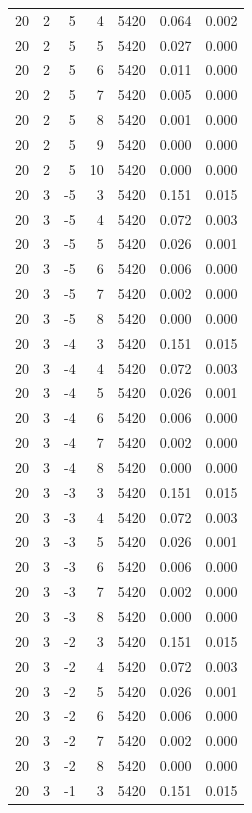 \begin{table}
\begin{tabular}{rrrrrrr}
20 & 2 & 5 & 4 & 5420 & 0.064 & 0.002 \\
20 & 2 & 5 & 5 & 5420 & 0.027 & 0.000 \\
20 & 2 & 5 & 6 & 5420 & 0.011 & 0.000 \\
20 & 2 & 5 & 7 & 5420 & 0.005 & 0.000 \\
20 & 2 & 5 & 8 & 5420 & 0.001 & 0.000 \\
20 & 2 & 5 & 9 & 5420 & 0.000 & 0.000 \\
20 & 2 & 5 & 10 & 5420 & 0.000 & 0.000 \\
20 & 3 & -5 & 3 & 5420 & 0.151 & 0.015 \\
20 & 3 & -5 & 4 & 5420 & 0.072 & 0.003 \\
20 & 3 & -5 & 5 & 5420 & 0.026 & 0.001 \\
20 & 3 & -5 & 6 & 5420 & 0.006 & 0.000 \\
20 & 3 & -5 & 7 & 5420 & 0.002 & 0.000 \\
20 & 3 & -5 & 8 & 5420 & 0.000 & 0.000 \\
20 & 3 & -4 & 3 & 5420 & 0.151 & 0.015 \\
20 & 3 & -4 & 4 & 5420 & 0.072 & 0.003 \\
20 & 3 & -4 & 5 & 5420 & 0.026 & 0.001 \\
20 & 3 & -4 & 6 & 5420 & 0.006 & 0.000 \\
20 & 3 & -4 & 7 & 5420 & 0.002 & 0.000 \\
20 & 3 & -4 & 8 & 5420 & 0.000 & 0.000 \\
20 & 3 & -3 & 3 & 5420 & 0.151 & 0.015 \\
20 & 3 & -3 & 4 & 5420 & 0.072 & 0.003 \\
20 & 3 & -3 & 5 & 5420 & 0.026 & 0.001 \\
20 & 3 & -3 & 6 & 5420 & 0.006 & 0.000 \\
20 & 3 & -3 & 7 & 5420 & 0.002 & 0.000 \\
20 & 3 & -3 & 8 & 5420 & 0.000 & 0.000 \\
20 & 3 & -2 & 3 & 5420 & 0.151 & 0.015 \\
20 & 3 & -2 & 4 & 5420 & 0.072 & 0.003 \\
20 & 3 & -2 & 5 & 5420 & 0.026 & 0.001 \\
20 & 3 & -2 & 6 & 5420 & 0.006 & 0.000 \\
20 & 3 & -2 & 7 & 5420 & 0.002 & 0.000 \\
20 & 3 & -2 & 8 & 5420 & 0.000 & 0.000 \\
20 & 3 & -1 & 3 & 5420 & 0.151 & 0.015 \\

\end{tabular}
\end{table}
